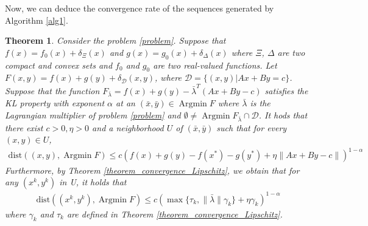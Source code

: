 \documentclass{article}
\numberwithin{equation}{section}
\newtheorem{theorem}{Theorem}[section]
\def\Argmin{\mathop{\mathrm{Argmin}}}
\begin{document}
Now, we can deduce the convergence rate of the sequences generated by Algorithm \ref{alg1}. 
\begin{theorem}
    Consider the problem \eqref{problem}. Suppose that $f(x) = f_0(x) + \delta_{\Xi}(x)$ and $g(x) = g_0(x) + \delta_{\Delta}(x)$ where 
    $\Xi$, $\Delta$ are two compact and convex sets and $f_0$ and $g_0$ are two real-valued functions.     
    Let $F(x,y)= f(x)+ g(y)+ \delta_{\mathcal{D}}(x,y)$, where $\mathcal{D} = \{(x,y)| Ax+By=c\}$. Suppose that the function $F_{\bar{\lambda}} = f(x) + g(y)- \bar{\lambda}^T(Ax+By-c)$ 
    satisfies the KL property with exponent $\alpha$ at an $(\bar{x},\bar{y}) \in \Argmin F$ where $\bar{\lambda}$ is the Lagrangian multiplier of problem \eqref{problem}  
    and $\emptyset \neq \Argmin F_{\bar{\lambda}}\cap \mathcal{D}$. It hods that there exist $c>0,\eta>0$ and
    a neighborhood $U$ of $(\bar{x}, \bar{y})$ such that for every $(x,y)\in U$,  
    \begin{align} 
        \mathrm{dist}\left((x,y), \Argmin F\right) \leq c\left(f(x) + g(y)-f(x^*)-g(y^*)+\eta\|Ax+By-c\rVert\right)^{1-\alpha} \nonumber
    \end{align} 
    Furthermore, by Theorem \ref{theorem_convergence_Lipschitz}, we obtain that for any $(x^k,y^k)$ in U, it holds that 
    \begin{align}
        \mathrm{dist}\left((x^k,y^k), \Argmin F\right) \leq  c(\max \{\tau_k, \|\bar{\lambda}\rVert\gamma_k\}+\eta\gamma_k)^{1-\alpha}   \nonumber
    \end{align}
    where $\gamma_k$ and $\tau_k$ are defined in Theorem \ref{theorem_convergence_Lipschitz}. 
    \end{theorem}
\end{document}
